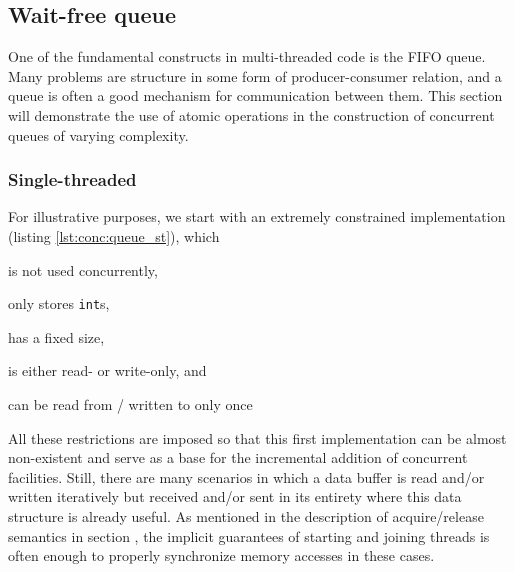 \subsection{Wait-free queue}

One of the fundamental constructs in multi-threaded code is the FIFO queue.
Many problems are structure in some form of producer-consumer relation, and a
queue is often a good mechanism for communication between them.  This section
will demonstrate the use of atomic operations in the construction of concurrent
queues of varying complexity.

\begin{figure}[ht]
    \centering
    \begin{subfigure}[t]{0.5\textwidth}
        
    \end{subfigure}
    \begin{subfigure}[t]{0.45\textwidth}
        
    \end{subfigure}
\end{figure}

\subsubsection{Single-threaded}

For illustrative purposes, we start with an extremely constrained implementation
(listing \ref{lst:conc:queue_st}), which
\begin{enumerate*}[1)]
    \item is not used concurrently,
    \item only stores \texttt{int}s,
    \item has a fixed size,
    \item is either read- or write-only, and
    \item can be read from / written to only once
\end{enumerate*}

All these restrictions are imposed so that this first implementation can be
almost non-existent and serve as a base for the incremental addition of
concurrent facilities.  Still, there are many scenarios in which a data buffer
is read and/or written iteratively but received and/or sent in its entirety
where this data structure is already useful.  As mentioned in the description of
acquire/release semantics in section , the
implicit guarantees of starting and joining threads is often enough to properly
synchronize memory accesses in these cases.

